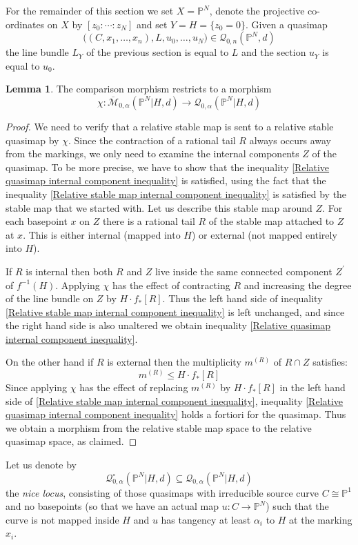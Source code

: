 \documentclass[11pt]{amsart}
\newcommand{\M}[4]{\overline{\mathcal{M}}_{#1,#2}(#3,#4)}
\newcommand{\Q}[4]{\mathcal{Q}_{#1,#2}(#3,#4)}
\newcommand{\PP}{\mathbb P}
\renewcommand{\to}{\rightarrow}
\theoremstyle{definition}
\newtheorem{lem}[thm]{Lemma}
\theoremstyle{definition}
\newcommand{\ilemph}[1]{\emph{#1}}
\begin{document}
For the remainder of this section we set $X=\PP^N$, denote the projective co-ordinates on $X$ by $[z_0: \cdots: z_N]$ and set $Y=H=\{ z_0 = 0 \}$. Given a quasimap
\begin{equation*} \big((C,x_1,\ldots,x_n), L, u_0,\ldots,u_N\big) \in \Q{0}{n}{\PP^N}{d} \end{equation*}
the line bundle $L_Y$ of the previous section is equal to $L$ and the section $u_Y$ is equal to $u_0$.

\begin{lem}\label{lem:comparison}
The comparison morphism restricts to a morphism 
\begin{equation*} \chi: \M{0}{\alpha}{\PP^N|H}{d}\to \Q{0}{\alpha}{\PP^N|H}{d} \end{equation*}
\end{lem}
\begin{proof}
We need to verify that a relative stable map is sent to a relative stable quasimap by $\chi$. Since the contraction of a rational tail $R$ always occurs away from the markings, we only need to examine the internal components $Z$ of the quasimap. To be more precise, we have to show that the inequality \eqref{Relative quasimap internal component inequality} is satisfied, using the fact that the inequality \eqref{Relative stable map internal component inequality} is satisfied by the stable map that we started with.  Let us describe this stable map around $Z$. For each basepoint $x$ on $Z$ there is a rational tail $R$ of the stable map attached to $Z$ at $x$. This is either internal (mapped into $H$) or external (not mapped entirely into $H$).  

If $R$ is internal then both $R$ and $Z$ live inside the same connected component $Z^\prime$ of $f^{-1}(H)$. Applying $\chi$ has the effect of contracting $R$ and increasing the degree of the line bundle on $Z$ by $H \cdot f_* [R]$. Thus the left hand side of inequality \eqref{Relative stable map internal component inequality} is left unchanged, and since the right hand side is also unaltered we obtain inequality \eqref{Relative quasimap internal component inequality}.

On the other hand if $R$ is external then the multiplicity $m^{(R)}$ of $R \cap Z$ satisfies:
\begin{equation*} m^{(R)} \leq H \cdot f_* [R] \end{equation*}
Since applying $\chi$ has the effect of replacing $m^{(R)}$ by $H \cdot f_* [R]$ in the left hand side of \eqref{Relative stable map internal component inequality}, inequality \eqref{Relative quasimap internal component inequality} holds a fortiori for the quasimap. Thus we obtain a morphism from the relative stable map space to the relative quasimap space, as claimed.
\end{proof}
Let us denote by
\begin{equation*} \mathcal Q^{\circ}_{0,\alpha}(\PP^N|H,d) \subseteq \Q{0}{\alpha}{\PP^N|H}{d} \end{equation*}
the \ilemph{nice locus}, consisting of those quasimaps with irreducible source curve $C \cong \PP^1$ and no basepoints (so that we have an actual map $u : C \to \PP^N$) such that the curve is not mapped inside $H$ and $u$ has tangency at least $\alpha_i$ to $H$ at the marking $x_i$.
\end{document}
